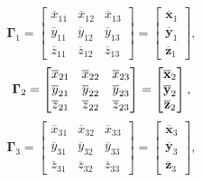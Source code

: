 \documentclass[10pt,b5paper,titlepage]{book}
\begin{document}
\begin{itemize}
        \begin{equation}
            \mathbf{\Gamma}_{1}
            = \begin{bmatrix}
                \overline{x}_{11} & \overline{x}_{12} & \overline{x}_{13}\\
                \overline{y}_{11} & \overline{y}_{12} & \overline{y}_{13}\\
                \overline{z}_{11} & \overline{z}_{12} & \overline{z}_{13}
            \end{bmatrix}
            = \begin{bmatrix}
                \overline{\mathbf{x}}_{1}\\
                \overline{\mathbf{y}}_{1}\\
                \overline{\mathbf{z}}_{1}
            \end{bmatrix}
        ,\end{equation}
        \begin{equation}
            \mathbf{\Gamma}_{2}
            = \begin{bmatrix}
                \overline{x}_{21} & \overline{x}_{22} & \overline{x}_{23}\\
                \overline{y}_{21} & \overline{y}_{22} & \overline{y}_{23}\\
                \overline{z}_{21} & \overline{z}_{22} & \overline{z}_{23}
            \end{bmatrix}
            = \begin{bmatrix}
                \overline{\mathbf{x}}_{2}\\
                \overline{\mathbf{y}}_{2}\\
                \overline{\mathbf{z}}_{2}
            \end{bmatrix} \\
        ,\end{equation}
        \begin{equation}
            \mathbf{\Gamma}_{3}
            = \begin{bmatrix}
                \overline{x}_{31} & \overline{x}_{32} & \overline{x}_{33}\\
                \overline{y}_{31} & \overline{y}_{32} & \overline{y}_{33}\\
                \overline{z}_{31} & \overline{z}_{32} & \overline{z}_{33}
            \end{bmatrix}
            = \begin{bmatrix}
                \overline{\mathbf{x}}_{3}\\
                \overline{\mathbf{y}}_{3}\\
                \overline{\mathbf{z}}_{3}
            \end{bmatrix}
        ,\end{equation}


\end{itemize}
\end{document}
